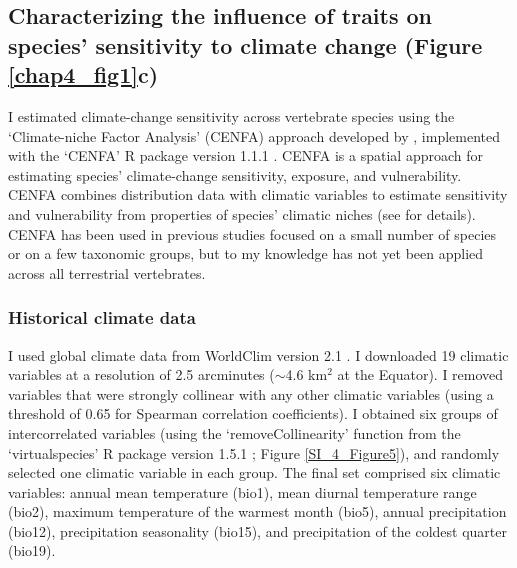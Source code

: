 \pagebreak

\subsection{Characterizing the influence of traits on species' sensitivity to climate change (Figure \ref{chap4_fig1}c)}

I estimated climate-change sensitivity across vertebrate species using the `Climate-niche Factor Analysis' (CENFA) approach developed by \citet{Rinnan2019}, implemented with the `CENFA'  R package  version 1.1.1 \citep{CENFA}. CENFA is a spatial approach for estimating species' climate-change sensitivity, exposure, and vulnerability. CENFA combines distribution data with climatic variables to estimate sensitivity and vulnerability from properties of species' climatic niches (see \citet{Rinnan2019} for details). CENFA has been used in previous studies focused on a small number of species or on a few taxonomic groups, but to my knowledge has not yet been applied across all terrestrial vertebrates.

\subsubsection{Historical climate data}
I used global climate data  from WorldClim version 2.1 \citep{Fick2017}. I downloaded 19 climatic variables at a resolution of 2.5 arcminutes ($\sim$4.6 km$^2$ at the Equator). I removed variables that were strongly collinear with any other climatic variables (using a threshold of 0.65 for Spearman correlation coefficients). I obtained six groups of intercorrelated variables (using the `removeCollinearity' function from the `virtualspecies' R package version 1.5.1 \citep{virtualspecies}; Figure \ref{SI_4_Figure5}), and randomly selected one climatic variable in each group. The final set comprised six climatic variables: annual mean temperature (bio1), mean diurnal temperature range (bio2), maximum temperature of the warmest month (bio5), annual precipitation (bio12), precipitation seasonality (bio15), and precipitation of the coldest quarter (bio19).

